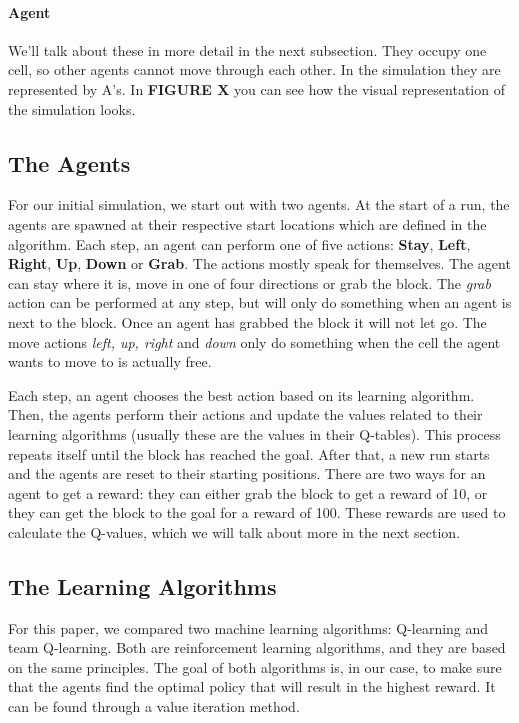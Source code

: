 \paragraph{Agent}
We'll talk about these in more detail in the next subsection. They occupy one cell, so other agents cannot move through each other. In the simulation they are represented by A's.
In \textbf{FIGURE X} you can see how the visual representation of the simulation looks.
\subsection{The Agents}
For our initial simulation, we start out with two agents. At the start of a run, the agents are spawned at their respective start locations which are defined in the algorithm. Each step, an agent can perform one of five actions: \textbf{Stay}, \textbf{Left}, \textbf{Right}, \textbf{Up}, \textbf{Down} or \textbf{Grab}. The actions mostly speak for themselves. The agent can stay where it is, move in one of four directions or grab the block. The \textit{grab} action can be performed at any step, but will only do something when an agent is next to the block. Once an agent has grabbed the block it will not let go. The move actions \textit{left, up, right} and \textit{down} only do something when the cell the agent wants to move to is actually free.

Each step, an agent chooses the best action based on its learning algorithm. Then, the agents perform their actions and update the values related to their learning algorithms (usually these are the values in their Q-tables). This process repeats itself until the block has reached the goal. After that, a new run starts and the agents are reset to their starting positions. There are two ways for an agent to get a reward: they can either grab the block to get a reward of 10, or they can get the block to the goal for a reward of 100. These rewards are used to calculate the Q-values, which we will talk about more in the next section.

\subsection{The Learning Algorithms}
For this paper, we compared two machine learning algorithms: Q-learning and team Q-learning. Both are reinforcement learning algorithms, and they are based on the same principles. The goal of both algorithms is, in our case, to make sure that the agents find the optimal policy that will result in the highest reward. It can be found through a value iteration method.


